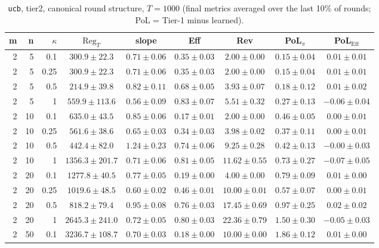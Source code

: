 \begin{table}[htbp]
\centering
\scriptsize
\caption{\texttt{ucb}, tier2, canonical round structure, $T=1000$ (final metrics averaged over the last 10\% of rounds; PoL = Tier-1 minus learned).}
\label{tab:tier2_ucb_canonical}
\begin{tabular}{@{}rrrcccccc@{}}
\toprule
m & n & $\kappa$ & $\mathrm{Reg}_T$ & slope & Eff & Rev & PoL$_\pi$ & PoL$_\mathrm{Eff}$ \\
\midrule
2 & 5 & 0.1 & $300.9 \pm 22.3$ & $0.71 \pm 0.06$ & $0.35 \pm 0.03$ & $2.00 \pm 0.00$ & $0.15 \pm 0.04$ & $0.01 \pm 0.01$ \\
2 & 5 & 0.25 & $300.9 \pm 22.3$ & $0.71 \pm 0.06$ & $0.35 \pm 0.03$ & $2.00 \pm 0.00$ & $0.15 \pm 0.04$ & $0.01 \pm 0.01$ \\
2 & 5 & 0.5 & $214.9 \pm 39.8$ & $0.82 \pm 0.11$ & $0.68 \pm 0.05$ & $3.93 \pm 0.07$ & $0.18 \pm 0.12$ & $0.01 \pm 0.02$ \\
2 & 5 & 1 & $559.9 \pm 113.6$ & $0.56 \pm 0.09$ & $0.83 \pm 0.07$ & $5.51 \pm 0.32$ & $0.27 \pm 0.13$ & $-0.06 \pm 0.04$ \\
2 & 10 & 0.1 & $635.0 \pm 43.5$ & $0.85 \pm 0.06$ & $0.17 \pm 0.01$ & $2.00 \pm 0.00$ & $0.46 \pm 0.05$ & $0.00 \pm 0.01$ \\
2 & 10 & 0.25 & $561.6 \pm 38.6$ & $0.65 \pm 0.03$ & $0.34 \pm 0.03$ & $3.98 \pm 0.02$ & $0.37 \pm 0.11$ & $0.00 \pm 0.01$ \\
2 & 10 & 0.5 & $442.4 \pm 82.0$ & $1.24 \pm 0.23$ & $0.74 \pm 0.06$ & $9.25 \pm 0.28$ & $0.42 \pm 0.13$ & $-0.00 \pm 0.03$ \\
2 & 10 & 1 & $1356.3 \pm 201.7$ & $0.71 \pm 0.06$ & $0.81 \pm 0.05$ & $11.62 \pm 0.55$ & $0.73 \pm 0.27$ & $-0.07 \pm 0.05$ \\
2 & 20 & 0.1 & $1277.8 \pm 40.5$ & $0.77 \pm 0.05$ & $0.19 \pm 0.00$ & $4.00 \pm 0.00$ & $0.79 \pm 0.09$ & $0.01 \pm 0.00$ \\
2 & 20 & 0.25 & $1019.6 \pm 48.5$ & $0.60 \pm 0.02$ & $0.46 \pm 0.01$ & $10.00 \pm 0.01$ & $0.57 \pm 0.07$ & $0.00 \pm 0.01$ \\
2 & 20 & 0.5 & $818.2 \pm 79.4$ & $0.95 \pm 0.08$ & $0.76 \pm 0.03$ & $17.45 \pm 0.69$ & $0.97 \pm 0.25$ & $0.02 \pm 0.02$ \\
2 & 20 & 1 & $2645.3 \pm 241.0$ & $0.72 \pm 0.05$ & $0.80 \pm 0.03$ & $22.36 \pm 0.79$ & $1.50 \pm 0.30$ & $-0.05 \pm 0.03$ \\
2 & 50 & 0.1 & $3236.7 \pm 108.7$ & $0.70 \pm 0.03$ & $0.18 \pm 0.00$ & $10.00 \pm 0.00$ & $1.86 \pm 0.12$ & $0.01 \pm 0.00$ \\

\end{tabular}
\end{table}
